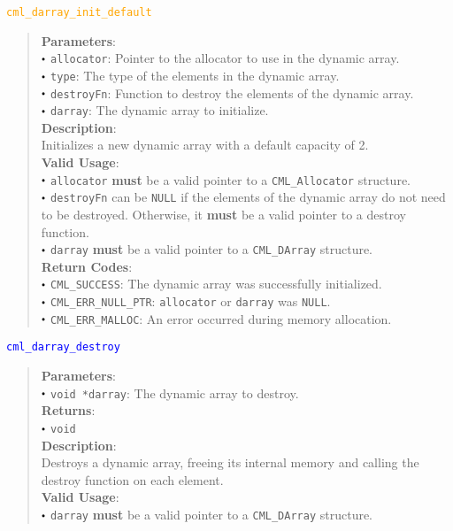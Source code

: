\documentclass[a4paper,oneside,8pt]{extarticle}
\newcommand{\function}[1]{
  \noindent\textcolor{blue}{\texttt{#1}}
  \vspace{-0.3em}
}
\newcommand{\macro}[1]{
  \noindent\textcolor{orange}{\texttt{#1}}
  \vspace{-0.3em}
}
\renewcommand{\dot}{\raisebox{0.3ex}{\scalebox{0.6}{$\bullet$}}}
\theoremstyle{definition}
\begin{document}
\macro{cml\_darray\_init\_default}
\begin{quote}
  \textbf{Parameters}: \\
  $\dot$ \texttt{allocator}: Pointer to the allocator to use in the dynamic array. \\
  $\dot$ \texttt{type}: The type of the elements in the dynamic array. \\
  $\dot$ \texttt{destroyFn}: Function to destroy the elements of the dynamic array. \\
  $\dot$ \texttt{darray}: The dynamic array to initialize. \\
  
  \vspace{-0.75em}
  \textbf{Description}: \\
  Initializes a new dynamic array with a default capacity of 2. \\

  \vspace{-0.75em}
  \textbf{Valid Usage}: \\
  $\dot$ \texttt{allocator} \textbf{must} be a valid pointer to a \texttt{CML\_Allocator} structure. \\
  $\dot$ \texttt{destroyFn} can be \texttt{NULL} if the elements of the dynamic array do not need to be destroyed. Otherwise, it \textbf{must} be a valid pointer to a destroy function. \\
  $\dot$ \texttt{darray} \textbf{must} be a valid pointer to a \texttt{CML\_DArray} structure. \\

  \vspace{-0.75em}
  \textbf{Return Codes}: \\
  $\dot$ \texttt{CML\_SUCCESS}: The dynamic array was successfully initialized. \\
  $\dot$ \texttt{CML\_ERR\_NULL\_PTR}: \texttt{allocator} or \texttt{darray} was \texttt{NULL}. \\
  $\dot$ \texttt{CML\_ERR\_MALLOC}: An error occurred during memory allocation. \\
\end{quote}

\function{cml\_darray\_destroy}
\begin{quote}
  \textbf{Parameters}: \\
  $\dot$ \texttt{void *darray}: The dynamic array to destroy. \\
  \textbf{Returns}: \\
  $\dot$ \texttt{void} \\
  
  \vspace{-0.75em}
  \textbf{Description}: \\
  Destroys a dynamic array, freeing its internal memory and calling the destroy function on each element. \\

  \vspace{-0.75em}
  \textbf{Valid Usage}: \\
  $\dot$ \texttt{darray} \textbf{must} be a valid pointer to a \texttt{CML\_DArray} structure. \\
\end{quote}
\end{document}
